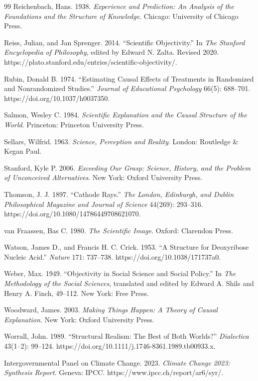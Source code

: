\begin{thebibliography}{99}
Reichenbach, Hans. 1938. \emph{Experience and Prediction: An Analysis of the Foundations and the Structure of Knowledge}. Chicago: University of Chicago Press.

Reiss, Julian, and Jan Sprenger. 2014. \enquote{Scientific Objectivity.} In \emph{The Stanford Encyclopedia of Philosophy}, edited by Edward N. Zalta. Revised 2020. https://plato.stanford.edu/entries/scientific-objectivity/.

Rubin, Donald B. 1974. \enquote{Estimating Causal Effects of Treatments in Randomized and Nonrandomized Studies.} \emph{Journal of Educational Psychology} 66(5): 688--701. https://doi.org/10.1037/h0037350.

Salmon, Wesley C. 1984. \emph{Scientific Explanation and the Causal Structure of the World}. Princeton: Princeton University Press.

Sellars, Wilfrid. 1963. \emph{Science, Perception and Reality}. London: Routledge \& Kegan Paul.

Stanford, Kyle P. 2006. \emph{Exceeding Our Grasp: Science, History, and the Problem of Unconceived Alternatives}. New York: Oxford University Press.

Thomson, J. J. 1897. \enquote{Cathode Rays.} \emph{The London, Edinburgh, and Dublin Philosophical Magazine and Journal of Science} 44(269): 293--316. https://doi.org/10.1080/14786449708621070.

van Fraassen, Bas C. 1980. \emph{The Scientific Image}. Oxford: Clarendon Press.

Watson, James D., and Francis H. C. Crick. 1953. \enquote{A Structure for Deoxyribose Nucleic Acid.} \emph{Nature} 171: 737--738. https://doi.org/10.1038/171737a0.

Weber, Max. 1949. \enquote{Objectivity in Social Science and Social Policy.} In \emph{The Methodology of the Social Sciences}, translated and edited by Edward A. Shils and Henry A. Finch, 49--112. New York: Free Press.

Woodward, James. 2003. \emph{Making Things Happen: A Theory of Causal Explanation}. New York: Oxford University Press.

Worrall, John. 1989. \enquote{Structural Realism: The Best of Both Worlds?} \emph{Dialectica} 43(1--2): 99--124. https://doi.org/10.1111/j.1746-8361.1989.tb00933.x.

Intergovernmental Panel on Climate Change. 2023. \emph{Climate Change 2023: Synthesis Report}. Geneva: IPCC. https://www.ipcc.ch/report/ar6/syr/.

\end{thebibliography}

